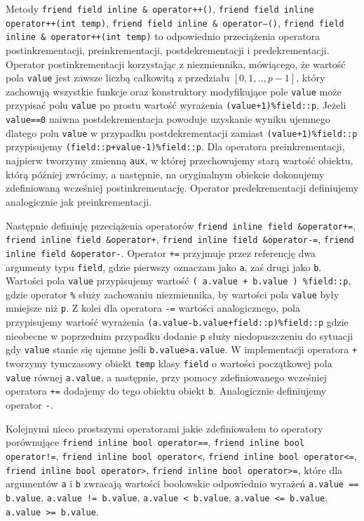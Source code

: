 \documentclass{article}
\begin{document}
Metody \texttt{friend field inline \& operator++()}, 
\texttt{friend field inline operator++(int temp)},
\texttt{friend field inline \& operator--()},
\texttt{friend field inline \& operator++(int temp)} to odpowiednio przeciążenia
operatora postinkrementacji, preinkrementacji, postdekrementacji i predekrementacji.
Operator postinkrementacji korzystając z niezmiennika, mówiącego,
że wartość pola \texttt{value} jest zawsze liczbą całkowitą z
przedziału $[0,1,..,p-1]$, który
zachowują wszystkie funkcje oraz konstruktory modyfikujące pole \texttt{value} 
może przypisać polu \texttt{value} po prostu wartość wyrażenia
\texttt{(value+1)\%field::p}. Jeżeli \texttt{value==0} naiwna postdekrementacja
powoduje uzyskanie wyniku ujemnego dlatego polu \texttt{value} w przypadku postdekrementacji
zamiast \texttt{(value+1)\%field::p} przypisujemy 
\texttt{(field::p+value-1)\%field::p}. Dla operatora 
preinkrementacji, najpierw tworzymy zmienną \texttt{aux}, w której przechowujemy
starą wartość obiektu, którą później zwrócimy, a następnie, na oryginalnym 
obiekcie dokonujemy zdefiniowaną wcześniej postinkrementację.
Operator predekrementacji definiujemy analogicznie jak preinkrementacji.

Następnie definiuję przeciążenia operatorów 
\texttt{friend inline field \&operator+=},
\texttt{friend inline field \&operator+},
\texttt{friend inline field \&operator-=},
\texttt{friend inline field \&operator-}. Operator
\texttt{+=} przyjmuje przez referencję dwa argumenty typu \texttt{field},
gdzie pierwszy oznaczam jako \texttt{a}, zaś drugi jako \texttt{b}. Wartości pola
\texttt{value} przypisujemy wartość \texttt{( a.value + b.value ) \%field::p}, gdzie 
operator \texttt{\%} służy zachowaniu niezmiennika, by wartości pola \texttt{value}
były mniejsze niż \texttt{p}. Z kolei dla operatora \texttt{-=} wartości analogicznego,
pola przypisujemy wartość wyrażenia \texttt{(a.value-b.value+field::p)\%field::p}
gdzie nieobecne w poprzednim przypadku dodanie \texttt{p} służy niedopuszczeniu
do sytuacji gdy \texttt{value} stanie się ujemne jeśli \texttt{b.value>a.value}.
W implementacji operatora \texttt{+} tworzymy tymczasowy obiekt \texttt{temp} klasy 
\texttt{field} o wartości
początkowej pola \texttt{value} równej \texttt{a.value}, a następnie,
przy pomocy zdefiniowanego wcześniej operatora \texttt{+=} dodajemy do tego obiektu
obiekt \texttt{b}. Analogicznie definiujemy operator \texttt{-}.

Kolejnymi nieco prostszymi operatorami jakie zdefiniowałem to operatory porównujące
\texttt{friend inline bool operator==}, 
\texttt{friend inline bool operator!=}, 
\texttt{friend inline bool operator<},
\texttt{friend inline bool operator<=}, 
\texttt{friend inline bool operator>}, 
\texttt{friend inline bool operator>=}, 
które dla argumentów \texttt{a} i \texttt{b} zwracają wartości boolowskie 
odpowiednio wyrażeń 
\texttt{a.value == b.value}, 
\texttt{a.value != b.value},
\texttt{a.value < b.value},
\texttt{a.value <= b.value},
\texttt{a.value >= b.value}.
\end{document}
